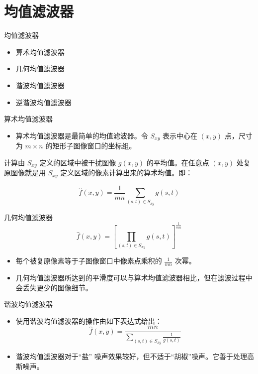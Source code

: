 \documentclass[presentation]{beamer}
\begin{document}
\section{均值滤波器}
\label{sec:orgc24eeb1}
\begin{frame}[label={sec:orge035e76}]{均值滤波器}
\begin{itemize}
\item 算术均值滤波器
\item 几何均值滤波器
\item 谐波均值滤波器
\item 逆谐波均值滤波器
\end{itemize}
\end{frame}
\begin{frame}[label={sec:orgd4a901d}]{算术均值滤波器}
\begin{itemize}
\item 算术均值滤波器是最简单的均值滤波器。令 \(S_{xy}\) 表示中心在 \((x,y)\) 点，尺寸为 \(m\times n\) 的矩形子图像窗口的坐标组。
\end{itemize}
计算由 \(S_{xy}\) 定义的区域中被干扰图像 \(g(x,y)\) 的平均值。在任意点 \((x,y)\) 处复原图像就是用 \(S_{xy}\) 定义区域的像素计算出来的算术均值。即：

\[ \hat f(x,y) = \frac{1}{mn}\sum_{(s,t)\in S_{xy}}g(s,t) \]
\end{frame}

\begin{frame}[label={sec:orgc44fb13}]{几何均值滤波器}
\[ \hat f(x,y) = \left[\prod_{(s,t)\in S_{xy}}g(s,t)\right]^{\frac{1}{mn}} \]

\begin{itemize}
\item 每个被复原像素等于子图像窗口中像素点乘积的 \(\frac{1}{mn}\) 次幂。
\item 几何均值滤波器所达到的平滑度可以与算术均值滤波器相比，但在滤波过程中会丢失更少的图像细节。
\end{itemize}
\end{frame}

\begin{frame}[label={sec:org7973d9f}]{谐波均值滤波器}
\begin{itemize}
\item 使用谐波均值滤波器的操作由如下表达式给出：
\[ \hat f(x,y) = \frac{mn}{\sum_{(s,t)\in S_{xy}}\frac{1}{g(s,t)}} \]

\item 谐波均值滤波器对于“盐” 噪声效果较好，但不适于“胡椒”噪声。它善于处理高斯噪声。
\end{itemize}
\end{frame}
\end{document}
